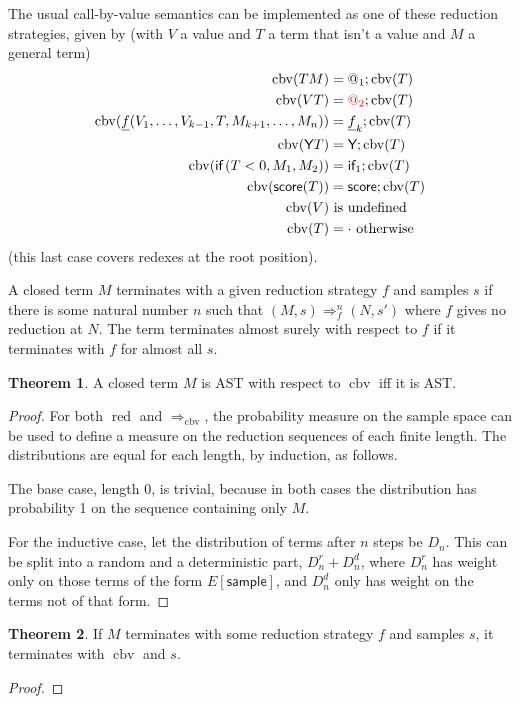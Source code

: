 \documentclass{article}
\newcommand{\tY}{\textsf{Y}}
\newcommand{\tif}[3]{\textsf{if}\,(#1, #2, #3)} %
\newcommand{\tsample}{\textsf{sample}}
\newcommand{\tscore}{\textsf{score}}
\DeclareMathOperator{\red}{red}
\DeclareMathOperator{\cbv}{cbv}
\theoremstyle{definition}
\theoremstyle{lemma}
\newtheorem{theorem}{Theorem}
\theoremstyle{remark}
\begin{document}
The usual call-by-value semantics can be implemented as one of these reduction strategies, given by (with $V$ a value and $T$ a term that isn't a value and $M$ a general term)
\begin{align*}
\cbv(T M) & = @_1 ; \cbv(T) \\
\cbv(V T) & = {\color{red} @_2} ; \cbv(T) \\
\cbv(\underline f(V_1, \dots, V_{k-1}, T, M_{k+1}, \dots, M_n)) & = \underline f_k ; \cbv(T) \\
\cbv(\tY T) & = \tY ; \cbv(T) \\
\cbv(\tif{T < 0}{M_1}{M_2}) & = \textsf{if}_1 ; \cbv(T) \\
\cbv(\tscore(T)) & = \tscore ; \cbv(T) \\
\cbv(V) & \text{ is undefined} \\
\cbv(T) & = \cdot \text{ otherwise}
\end{align*}
(this last case covers redexes at the root position).

A closed term $M$ terminates with a given reduction strategy $f$ and samples $s$ if there is some natural number $n$ such that $(M,s) \Rightarrow_f^n (N,s')$ where $f$ gives no reduction at $N$. The term terminates almost surely with respect to $f$ if it terminates with $f$ for almost all $s$.

\begin{theorem} \label{AstEquivalence}
A closed term $M$ is AST with respect to $\cbv$ iff it is AST.
\end{theorem}
\begin{proof}
For both $\red$ and $\Rightarrow_{\cbv}$, the probability measure on the sample space can be used to define a measure on the reduction sequences of each finite length. The distributions are equal for each length, by induction, as follows.

The base case, length 0, is trivial, because in both cases the distribution has probability 1 on the sequence containing only $M$.

For the inductive case, let the distribution of terms after $n$ steps be $D_n$. This can be split into a random and a deterministic part, $D_n^r + D_n^d$, where $D_n^r$ has weight only on those terms of the form $E[\tsample]$, and $D_n^d$ only has weight on the terms not of that form. 
\end{proof}

\begin{theorem} \label{CbvIsTerminatingest}
If $M$ terminates with some reduction strategy $f$ and samples $s$, it terminates with $\cbv$ and $s$.
\end{theorem}
\begin{proof}
\end{proof}
\end{document}
